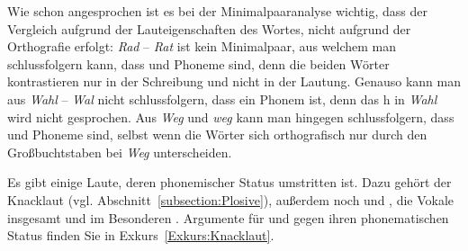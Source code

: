 Wie schon angesprochen ist es bei der Minimalpaaranalyse wichtig, dass der Vergleich aufgrund der Lauteigenschaften des Wortes, nicht aufgrund der Orthografie erfolgt: \textit{Rad} \textipa{[Ka:t]} -- \textit{Rat} \textipa{[Ka:t]} ist kein Minimalpaar, aus welchem man schlussfolgern kann, dass  und  Phoneme sind, denn die beiden Wörter kontrastieren nur in der Schreibung und nicht in der Lautung. Genauso kann man aus \textit{Wahl} \textipa{[va:l]} -- \textit{Wal} \textipa{[va:l]} nicht schlussfolgern, dass  ein Phonem ist, denn das h in \textit{Wahl} wird nicht gesprochen. Aus \textit{Weg} \textipa{[ve:k]} und \textit{weg} \textipa{[vEk]} kann man hingegen schlussfolgern, dass  und  Phoneme sind, selbst wenn die Wörter sich orthografisch nur durch den Großbuchtstaben bei \textit{Weg} unterscheiden.

Es gibt einige Laute, deren phonemischer Status umstritten ist. Dazu gehört der Knacklaut \textipa{[P]} (vgl. Abschnitt~\ref{subsection:Plosive}), außerdem noch \textipa{[\t{dZ}, Z]} und \textipa{[N]}, die Vokale insgesamt und im Besonderen \textipa{[E:, @, 5]}. Argumente für und gegen ihren phonematischen Status finden Sie in Exkurs~\ref{Exkurs:Knacklaut}.


